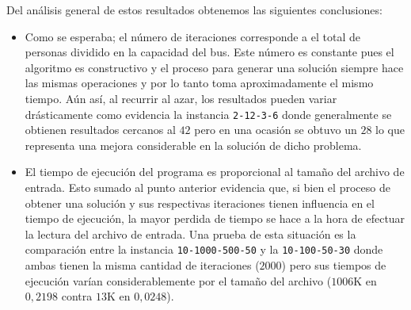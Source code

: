 \documentclass[letter, 10pt]{article}
\begin{document}
    Del análisis general de estos resultados obtenemos las siguientes
    conclusiones:
    \begin{itemize}
        \item
            Como se esperaba; el número de iteraciones corresponde a el total de
            personas dividido en la capacidad del bus. Este número es constante
            pues el algoritmo es constructivo y el proceso para
            generar una solución siempre hace las mismas operaciones y por lo
            tanto toma aproximadamente el mismo tiempo.
            Aún así, al recurrir al azar, los resultados pueden variar
            drásticamente como evidencia la instancia \texttt{2-12-3-6} donde
            generalmente se obtienen resultados cercanos al $42$ pero en una
            ocasión se obtuvo un $28$ lo que representa una mejora considerable
            en la solución de dicho problema.
        \item
            El tiempo de ejecución del programa es proporcional al tamaño del
            archivo de entrada. Esto sumado al punto anterior evidencia que, si
            bien el proceso de obtener una solución y sus respectivas
            iteraciones tienen influencia en el tiempo de ejecución, la mayor
            perdida de tiempo se hace a la hora de efectuar la lectura del
            archivo de entrada. Una prueba de esta situación es la comparación
            entre la instancia \texttt{10-1000-500-50} y la
            \texttt{10-100-50-30} donde ambas tienen la misma cantidad de
            iteraciones ($2000$) pero sus tiempos de ejecución varían
            considerablemente por el tamaño del archivo ($1006$K en $0,2198$
            contra $13$K en $0,0248$).


\end{itemize}
\end{document}
